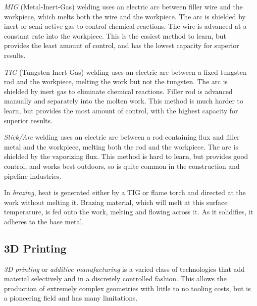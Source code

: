  	\begin{asparaenum}[a)]
 		\item \textit{MIG} (Metal-Inert-Gas) welding uses an electric arc between filler wire and the workpiece, which melts both the wire and the workpiece. The arc is shielded by inert or semi-active gas to control chemical reactions. The wire is advanced at a constant rate into the workpiece. This is the easiest method to learn, but provides the least amount of control, and has the lowest capacity for superior results.
 		
 		\item \textit{TIG} (Tungsten-Inert-Gas) welding uses an electric arc between a fixed tungsten rod and the workpiece, melting the work but not the tungsten. The arc is shielded by inert gas to eliminate chemical reactions. Filler rod is advanced manually and separately into the molten work. This method is much harder to learn, but provides the most amount of control, with the highest capacity for superior results.
 		
 		\item \textit{Stick/Arc} welding uses an electric arc between a rod containing flux and filler metal and the workpiece, melting both the rod and the workpiece. The arc is shielded by the vaporizing flux. This method is hard to learn, but provides good control, and works best outdoors, so is quite common in the construction and pipeline industries.
 		
 		\item In \textit{brazing}, heat is generated either by a TIG or flame torch and directed at the work without melting it. Brazing material, which will melt at this surface temperature, is fed onto the work, melting and flowing across it. As it solidifies, it adheres to the base metal.
 		
 	\end{asparaenum}
 	
 	\subsection{3D Printing}
 	\textit{3D printing} or \textit{additive manufacturing} is a varied class of technologies that add material selectively and in a discretely controlled fashion. This allows the production of extremely complex geometries with little to no tooling costs, but is a pioneering field and has many limitations.
 	
